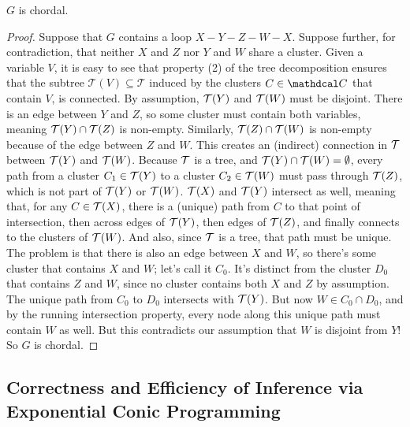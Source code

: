 \begin{subappendices}
\begin{lproof}
    \begin{iclaim}
        $G$ is chordal.
    \end{iclaim}
    \begin{proof}
        Suppose that $G$ contains a loop $X{-}Y{-}Z{-}W{-}X$.
        Suppose further, for contradiction, that neither $X$ and $Z$ nor $Y$ and $W$ share a cluster.
        Given a variable $V$, it is easy to see that property (2) of the tree decomposition ensures that the subtree $\mathcal T(V) \subseteq \mathcal T$ induced by the clusters $C \in \C$ that contain $V$, is connected.
        By assumption, ${\cal T}(Y)$ and ${\cal T}(W)$ must be disjoint.
        There is an edge between $Y$ and $Z$, so some cluster must contain both variables, meaning ${\cal T}(Y) \cap {\cal T}(Z)$ is non-empty.
        Similarly, ${\cal T}(Z) \cap {\cal T}(W)$ is non-empty because of the edge between $Z$ and $W$.
        This creates an (indirect) connection in $\cal T$ between ${\cal T}(Y)$ and ${\cal T}(W)$. Because $\cal T$ is a tree, and ${\cal T}(Y) \cap {\cal T}(W) = \emptyset$,
        every path from a cluster $C_1 \in {\cal T}(Y)$ to a cluster $C_2 \in {\cal T}(W)$ must pass through ${\cal T}(Z)$, which is not part of ${\cal T}(Y)$ or ${\cal T}(W)$.
        ${\cal T}(X)$ and ${\cal T}(Y)$ intersect as well, meaning that, for any $C \in {\cal T}(X)$, there is a (unique) path from $C$ to that point of intersection, then across edges of ${\cal T}(Y)$, then edges of ${\cal T}(Z)$, and finally connects to the clusters of ${\cal T}(W)$. And also, since $\cal T$ is a tree, that path must be unique.
        The problem is that there is also an edge between $X$ and $W$, so there's some cluster that contains $X$ and $W$; let's call it $C_0$.
        It's distinct from the cluster $D_0$ that contains $Z$ and $W$, since no cluster contains both $X$ and $Z$ by assumption.
        The unique path from $C_0$ to $D_0$
        intersects with ${\cal T}(Y)$.
        But now $W \in C_0 \cap D_0$, and by the running intersection property, every node along this unique path must contain $W$ as well.
        But this contradicts our assumption that $W$ is disjoint from $Y$! So $G$ is chordal.
    \end{proof}
\end{lproof}


\subsection{Correctness and Efficiency of Inference via Exponential Conic Programming}
    \label{proofs:expcone-efficient-correct}


\end{subappendices}
